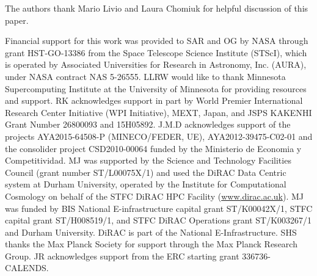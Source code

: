 
\begin{acknowledgments}
The authors thank Mario Livio and Laura Chomiuk for helpful discussion
of this paper.

Financial support for this work was provided to SAR and OG by NASA
through grant HST-GO-13386 from the Space Telescope Science Institute
(STScI), which is operated by Associated Universities for Research in
Astronomy, Inc. (AURA), under NASA contract NAS 5-26555. LLRW would
like to thank Minnesota Supercomputing Institute at the University of
Minnesota for providing resources and support.  RK acknowledges
support in part by World Premier International Research Center
Initiative (WPI Initiative), MEXT, Japan, and JSPS KAKENHI Grant
Number 26800093 and 15H05892.  J.M.D acknowledges support of the
projects AYA2015-64508-P (MINECO/FEDER, UE), AYA2012-39475-C02-01 and
the consolider project CSD2010-00064 funded by the Ministerio de
Economia y Competitividad.  MJ was supported by the Science and
Technology Facilities Council (grant number ST/L00075X/1) and used the
DiRAC Data Centric system at Durham University, operated by the
Institute for Computational Cosmology on behalf of the STFC DiRAC HPC
Facility (\url{www.dirac.ac.uk}).  MJ was funded by BIS National
E-infrastructure capital grant ST/K00042X/1, STFC capital grant
ST/H008519/1, and STFC DiRAC Operations grant ST/K003267/1 and Durham
University. DiRAC is part of the National E-Infrastructure.  SHS
thanks the Max Planck Society for support through the Max Planck
Research Group. JR acknowledges support from the ERC starting grant
336736-CALENDS.

\end{acknowledgments}
